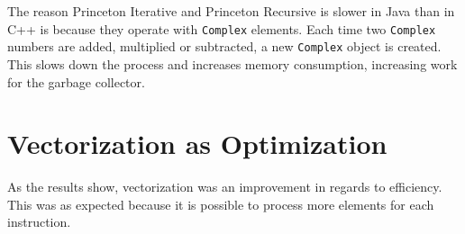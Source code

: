 The reason Princeton Iterative and Princeton Recursive is slower in Java than in C++ is because they operate with \texttt{Complex} elements. Each time two \texttt{Complex} numbers are added, multiplied or subtracted, a new \texttt{Complex} object is created. This slows down the process and increases memory consumption, increasing work for the garbage collector.







\section{Vectorization as Optimization}

As the results show, vectorization was an improvement in regards to efficiency. This was as expected because it is possible to process more elements for each instruction. 









% 

% 
